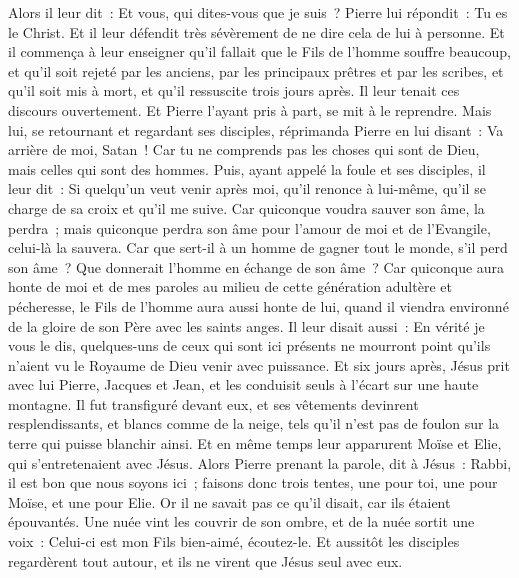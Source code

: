 \begin{multicols}{2}
Alors il leur dit~: Et vous, qui dites-vous que je suis~? Pierre lui répondit~: Tu es le Christ.
Et il leur défendit très sévèrement de ne dire cela de lui à personne.
Et il commença à leur enseigner qu'il fallait que le Fils de l'homme souffre beaucoup, et qu'il soit rejeté par les anciens, par les principaux prêtres et par les scribes, et qu'il soit mis à mort, et qu'il ressuscite trois jours après.
Il leur tenait ces discours ouvertement. Et Pierre l'ayant pris à part, se mit à le reprendre.
Mais lui, se retournant et regardant ses disciples, réprimanda Pierre en lui disant~: Va arrière de moi, Satan~! Car tu ne comprends pas les choses qui sont de Dieu, mais celles qui sont des hommes.
Puis, ayant appelé la foule et ses disciples, il leur dit~: Si quelqu'un veut venir après moi, qu'il renonce à lui-même, qu'il se charge de sa croix et qu'il me suive.
Car quiconque voudra sauver son âme, la perdra~; mais quiconque perdra son âme pour l'amour de moi et de l'Evangile, celui-là la sauvera.
Car que sert-il à un homme de gagner tout le monde, s'il perd son âme~?
Que donnerait l'homme en échange de son âme~?
Car quiconque aura honte de moi et de mes paroles au milieu de cette génération adultère et pécheresse, le Fils de l'homme aura aussi honte de lui, quand il viendra environné de la gloire de son Père avec les saints anges.
\VerseOne{}Il leur disait aussi~: En vérité je vous le dis, quelques-uns de ceux qui sont ici présents ne mourront point qu'ils n'aient vu le Royaume de Dieu venir avec puissance.
Et six jours après, Jésus prit avec lui Pierre, Jacques et Jean, et les conduisit seuls à l'écart sur une haute montagne. Il fut transfiguré devant eux,
et ses vêtements devinrent resplendissants, et blancs comme de la neige, tels qu'il n'est pas de foulon sur la terre qui puisse blanchir ainsi.
Et en même temps leur apparurent Moïse et Elie, qui s'entretenaient avec Jésus.
Alors Pierre prenant la parole, dit à Jésus~: Rabbi, il est bon que nous soyons ici~; faisons donc trois tentes, une pour toi, une pour Moïse, et une pour Elie.
Or il ne savait pas ce qu'il disait, car ils étaient épouvantés.
Une nuée vint les couvrir de son ombre, et de la nuée sortit une voix~: Celui-ci est mon Fils bien-aimé, écoutez-le.
Et aussitôt les disciples regardèrent tout autour, et ils ne virent que Jésus seul avec eux.

\end{multicols}

